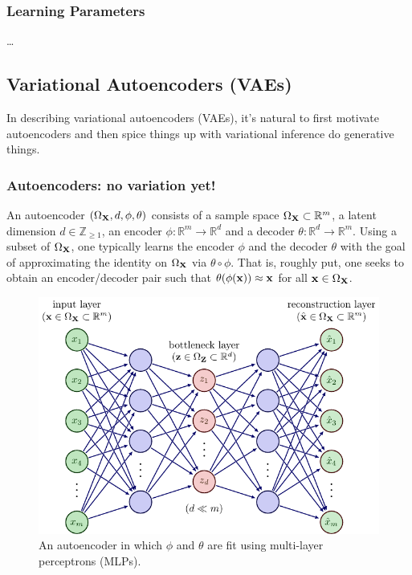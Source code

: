\documentclass[11pt]{article}
\begin{document}
\subsubsection{Learning Parameters}
\dots

\subsection{\REVIEW Variational Autoencoders (VAEs)}
In describing variational autoencoders (VAEs), it's natural to first motivate autoencoders and then spice things up with variational inference do generative things.

\subsubsection{Autoencoders: no variation yet!}
\label{sec:autoencoders}
An autoencoder $(\Omega_{\mathbf{X}},d,\phi,\theta)$ consists of a sample space $\Omega_{\mathbf{X}}\subset\mathbb{R}^m$, a latent dimension $d\in\mathbb{Z}_{\geq1}$, an encoder $\phi:\mathbb{R}^m\to\mathbb{R}^d$ and a decoder $\theta:\mathbb{R}^d\to\mathbb{R}^m$. Using a subset of $\Omega_{\mathbf{X}}$, one typically learns the encoder $\phi$ and the decoder $\theta$ with the goal of approximating the identity on $\Omega_{\mathbf{X}}$ via $\theta\circ \phi$. That is, roughly put, one seeks to obtain an encoder/decoder pair such that $\theta(\phi(\mathbf{x}))\approx\mathbf{x}$ for all $\mathbf{x}\in\Omega_{\mathbf{X}}$.

\begin{figure}[t]
    \centering
    \includegraphics[width=\columnwidth]{./figures/generative_models/AE_autoencoder.pdf}
    \caption{An autoencoder in which $\phi$ and $\theta$ are fit using multi-layer perceptrons (MLPs).}
    \label{fig:autoencoder}
\end{figure}
\end{document}
